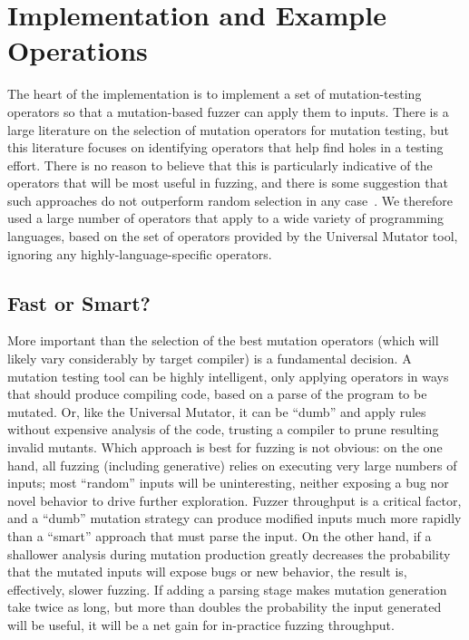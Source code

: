 \section{Implementation and Example Operations}
\label{implementation}

The heart of the implementation is to implement a set of mutation-testing operators
so that a mutation-based fuzzer can apply them to
inputs.  There is a large literature on the selection of mutation
operators for mutation testing, but this literature focuses on identifying
operators that help find holes in a testing effort.  There is no
reason to believe that this is particularly indicative of the
operators that will be most useful in fuzzing, and there is some
suggestion that such approaches do not outperform random selection in any case~\cite{MutReduct}.  We therefore 
used a large number of operators that apply to a wide variety of
programming languages, based on the set of operators provided by the
Universal Mutator tool, ignoring any highly-language-specific operators.

\subsection{Fast or Smart?}

More important than the selection of the best mutation operators
(which will likely vary considerably by target compiler) is a
fundamental decision.  A mutation testing tool can be highly intelligent, only
applying operators in ways that should produce compiling code, based
on a parse of the program to be mutated.  Or, like the Universal
Mutator, it can be ``dumb'' and apply rules without expensive analysis
of the code, trusting a compiler to prune resulting invalid
mutants.  Which approach is best for fuzzing is not obvious: on the
one hand, all fuzzing (including generative) relies on executing very
large numbers of inputs; most ``random'' inputs will be uninteresting,
neither exposing a bug nor novel behavior to drive further
exploration.  Fuzzer throughput is a critical factor, and a ``dumb''
mutation strategy can produce modified inputs much more rapidly than a
``smart'' approach that must parse the input.  On the other hand, if a
shallower analysis during mutation production greatly decreases the
probability that the mutated inputs will expose bugs or new behavior,
the result is, effectively, slower fuzzing.  If adding a parsing stage
makes mutation generation take twice as long, but more than doubles
the probability the input generated will be useful, it will be a net
gain for in-practice fuzzing throughput.

